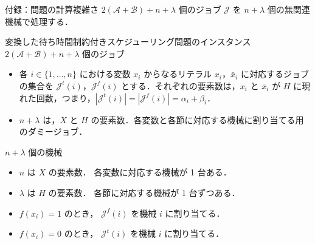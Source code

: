 \documentclass[dvipdfmx]{beamer}
\begin{document}
    \begin{frame}{付録：問題の計算複雑さ}
      $2(\mathcal{A} + \mathcal{B}) + n + \lambda$ 個のジョブ $\mathcal{J}$ を $n + \lambda$ 個の無関連機械で処理する．
      \begin{block}{変換した待ち時間制約付きスケジューリング問題のインスタンス}
        $2(\mathcal{A} + \mathcal{B}) + n + \lambda$ 個のジョブ
        \begin{itemize}
          \item 各 $i \in \{1,\ldots,n\}$ における変数 $x_i$ からなるリテラル $x_i$，$\bar x_i$ に対応するジョブの集合を $\mathcal{J}^t(i)$，$\mathcal{J}^f(i)$ とする．それぞれの要素数は，$x_i$ と $\bar x_i$ が $H$ に現れた回数，つまり，$|\mathcal{J}^t(i)| = |\mathcal{J}^f(i)| = \alpha_i + \beta_i$．
          \item $n + \lambda$ は，$X$ と $H$ の要素数．各変数と各節に対応する機械に割り当てる用のダミージョブ．
        \end{itemize}
        $n + \lambda$ 個の機械
        \begin{itemize}
          \item $n$ は $X$ の要素数．
          各変数に対応する機械が 1 台ある．
          \item $\lambda$ は $H$ の要素数．
          各節に対応する機械が 1 台ずつある．
        \end{itemize}
      \end{block}
      \begin{itemize}
        \item $f(x_i) = 1$ のとき，
        $\mathcal{J}^f(i)$ を機械 $i$ に割り当てる．
        \item $f(x_i) = 0$ のとき，
        $\mathcal{J}^t(i)$ を機械 $i$ に割り当てる．
      \end{itemize}
    \end{frame}
\end{document}
